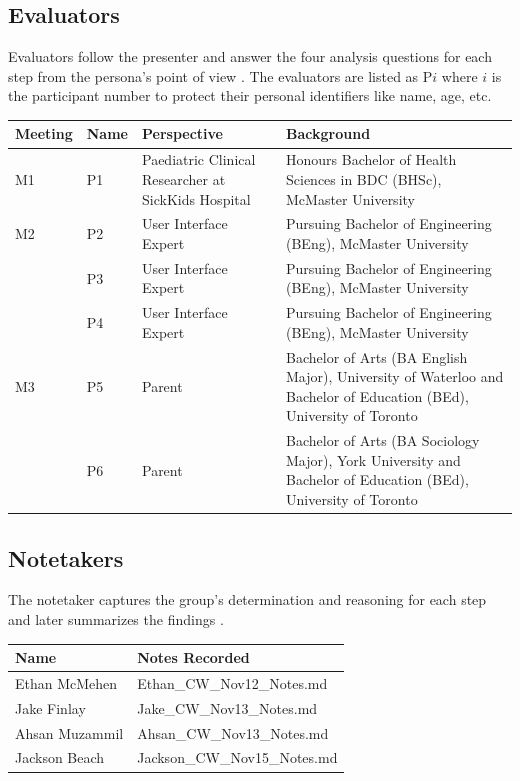 \documentclass{article}
\begin{document}
\subsection{Evaluators}

Evaluators follow the presenter and answer the four analysis questions for each step from the persona's point of view \cite{nng-workshop}. The 
evaluators are listed as P$i$ where $i$ is the participant number to protect their personal identifiers like name, age, etc.
\begin{table}[H]
\centering
\begin{tabularx}{\linewidth}{@{}l l Y Y@{}}
\toprule
\textbf{Meeting} & \textbf{Name} & \textbf{Perspective} & \textbf{Background} \\
\midrule
M1 & P1 & Paediatric Clinical Researcher at SickKids Hospital & Honours Bachelor of Health Sciences in BDC (BHSc), McMaster University \\
M2 & P2 & User Interface Expert & Pursuing Bachelor of Engineering (BEng), McMaster University \\
   & P3 & User Interface Expert & Pursuing Bachelor of Engineering (BEng), McMaster University \\
   & P4 & User Interface Expert & Pursuing Bachelor of Engineering (BEng), McMaster University \\
M3 & P5 & Parent & Bachelor of Arts (BA English Major), University of Waterloo and Bachelor of Education (BEd), University of Toronto \\
   & P6 & Parent & Bachelor of Arts (BA Sociology Major), York University and Bachelor of Education (BEd), University of Toronto \\
\bottomrule
\end{tabularx}
\end{table}

\subsection{Notetakers}

The notetaker captures the group's determination and reasoning for each step and later summarizes the findings \cite{nng-workshop}.

\begin{table}[H]
\centering
\begin{tabularx}{\linewidth}{@{}l Y@{}}
\toprule
\textbf{Name} & \textbf{Notes Recorded} \\
\midrule
Ethan McMehen & Ethan\_CW\_Nov12\_Notes.md \\
Jake Finlay & Jake\_CW\_Nov13\_Notes.md \\
Ahsan Muzammil & Ahsan\_CW\_Nov13\_Notes.md \\
Jackson Beach & Jackson\_CW\_Nov15\_Notes.md \\
\bottomrule
\end{tabularx}
\end{table}
\end{document}
